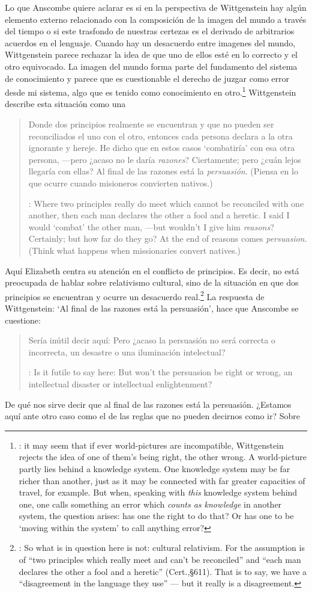     Lo que Anscombe quiere aclarar es si en la perspectiva de Wittgenstein hay algún elemento externo relacionado con la composición de la imagen del mundo a través del tiempo o si este trasfondo de nuestras certezas es el derivado de arbitrarios acuerdos en el lenguaje. Cuando hay un desacuerdo entre imagenes del mundo, Wittgenstein parece rechazar la idea de que uno de ellos esté en lo correcto y el otro equivocado. La imagen del mundo forma parte del fundamento del sistema de conocimiento y parece que es cuestionable el derecho de juzgar como error desde mi sistema, algo que es tenido como conocimiento en otro.\footnote{\cite[Cf.~][131--132]{anscombe1981parmenides:qli}: it may seem that if ever world-pictures are incompatible, Wittgenstein rejects the idea of one of them's being right, the other wrong. A world-picture partly lies behind a knowledge system. One knowledge system may be far richer than another, just as it may be connected with far greater capacities of travel, for example. But when, speaking with \emph{this} knowledge system behind one, one calls something an error which \emph{counts as knowledge} in another system, the question arises: has one the right to do that? Or has one to be `moving within the system' to call anything error?} Wittgenstein describe esta situación como una \blockquote[{\cite[\S611--612]{wittgenstein1969oncert}}: Where two principles really do meet which cannot be reconciled with one another, then each man declares the other a fool and a heretic. I said I would `combat' the other man, ---but wouldn't I give him \emph{reasons}? Certainly; but how far do they go? At the end of reasons comes \emph{persuasion}. (Think what happens when missionaries convert natives.)]{Donde dos principios realmente se encuentran y que no pueden ser reconciliados el uno con el otro, entonces cada persona declara a la otra ignorante y hereje. He dicho que en estos casos `combatiría' con esa otra persona, ---pero ¿acaso no le daría \emph{razones}? Ciertamente; pero ¿cuán lejos llegaría con ellas? Al final de las razones está la \emph{persuasión}. (Piensa en lo que ocurre cuando misioneros convierten nativos.)} Aquí Elizabeth centra su atención en el conflicto de principios. Es decir, no está preocupada de hablar sobre relativismo cultural, sino de la situación en que dos principios se encuentran y ocurre un desacuerdo real.\footnote{\cite[Cf.~][131]{anscombe1981parmenides:qli}: So what is in question here is not: cultural relativism. For the assumption is of ``two principles which really meet and can't be reconciled'' and ``each man declares the other a fool and a heretic'' (Cert.,\S611). That is to say, we have a ``disagreement in the language they use'' --- but it really is a disagreement.} La respuesta de Wittgenstein: \enquote*{Al final de las razones está la persuasión}, hace que Anscombe se cuestione: \blockquote[{\cite{anscombe1981parmenides:qli}}: Is it futile to say here: But won't the persuasion be right or wrong, an intellectual disaster or intellectual enlightenment?]{Sería inútil decir aquí: Pero ¿acaso la persuasión no será correcta o incorrecta, un desastre o una iluminación intelectual?} De qué nos sirve decir que al final de las razones está la persuasión. ¿Estamos aquí ante otro caso como el de las reglas que no pueden decirnos como ir? Sobre 